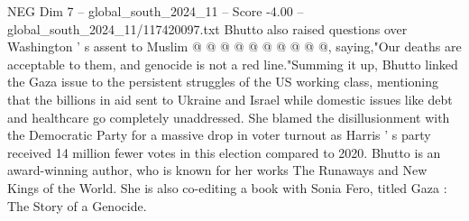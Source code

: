 \begin{textsample}{NEG Dim 7 – global\_south\_2024\_11 – Score -4.00 – global\_south\_2024\_11/117420097.txt}
Bhutto also raised questions over Washington ' s assent to Muslim @ @ @ @ @ @ @ @ @ @, saying,"Our deaths are acceptable to them, and genocide is not a red line."Summing it up, Bhutto linked the Gaza issue to the persistent struggles of the US working class, mentioning that the billions in aid sent to Ukraine and Israel while domestic issues like debt and healthcare go completely unaddressed.
She blamed the disillusionment with the Democratic Party for a massive drop in voter turnout as Harris ' s party received 14 million fewer votes in this election compared to 2020.
Bhutto is an award-winning author, who is known for her works The Runaways and New Kings of the World.
She is also co-editing a book with Sonia Fero, titled Gaza : The Story of a Genocide.

\end{textsample}

